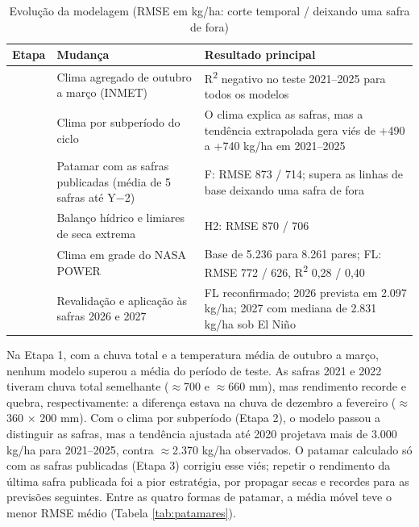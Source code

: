 \documentclass[
	article,			%
	11pt,				%
	oneside,			%
	a4paper,			%
	english,			%
	brazil,				%
	sumario=tradicional
	]{abntex2}
\begin{document}
\begin{table}[htbp]
\centering
\caption{Evolução da modelagem (RMSE em kg/ha: corte temporal / deixando uma safra de fora)}
\label{tab:etapas}
\small
\begin{tabular}{|>{\centering\arraybackslash}p{1.32cm}|>{\raggedright\arraybackslash}p{4.70cm}|>{\raggedright\arraybackslash}p{7.33cm}|}
\hline
\textbf{Etapa} & \textbf{Mudança} & \textbf{Resultado principal} \\ \hline
1 & Clima agregado de outubro a março (INMET) & R\textsuperscript{2} negativo no teste 2021--2025 para todos os modelos \\ \hline
2 & Clima por subperíodo do ciclo & O clima explica as safras, mas a tendência extrapolada gera viés de +490 a +740 kg/ha em 2021--2025 \\ \hline
3 & Patamar com as safras publicadas (média de 5 safras até Y$-$2) & F: RMSE 873 / 714; supera as linhas de base deixando uma safra de fora \\ \hline
4 & Balanço hídrico e limiares de seca extrema & H2: RMSE 870 / 706 \\ \hline
5 & Clima em grade do NASA POWER & Base de 5.236 para 8.261 pares; FL: RMSE 772 / 626, R\textsuperscript{2} 0,28 / 0,40 \\ \hline
6 & Revalidação e aplicação às safras 2026 e 2027 & FL reconfirmado; 2026 prevista em 2.097 kg/ha; 2027 com mediana de 2.831 kg/ha sob El Niño \\ \hline
\end{tabular}
\end{table}

Na Etapa 1, com a chuva total e a temperatura média de outubro a março, nenhum modelo superou a média do período de teste. As safras 2021 e 2022 tiveram chuva total semelhante ($\approx$700 e $\approx$660 mm), mas rendimento recorde e quebra, respectivamente: a diferença estava na chuva de dezembro a fevereiro ($\approx$360 $\times$ 200 mm). Com o clima por subperíodo (Etapa 2), o modelo passou a distinguir as safras, mas a tendência ajustada até 2020 projetava mais de 3.000 kg/ha para 2021--2025, contra $\approx$2.370 kg/ha observados. O patamar calculado só com as safras publicadas (Etapa 3) corrigiu esse viés; repetir o rendimento da última safra publicada foi a pior estratégia, por propagar secas e recordes para as previsões seguintes. Entre as quatro formas de patamar, a média móvel teve o menor RMSE médio (Tabela \ref{tab:patamares}).
\end{document}

